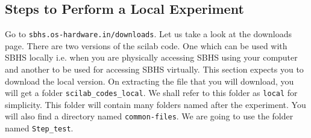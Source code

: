 \subsection{Steps to Perform a Local Experiment}\label{local-steps}
\label{scilab_sbhs}
Go to {\tt sbhs.os-hardware.in/downloads}. Let us take a look at the downloads page. There are two versions of the scilab code. One which can be used with SBHS locally i.e. when you are physically accessing SBHS using your computer and another to be used for accessing SBHS virtually. This section expects you to download the local version. On extracting the file that you will download, you will get a folder {\tt scilab\_codes\_local}. We shall refer to this folder as {\tt local} for simplicity. This folder will contain many folders named after the experiment. You will also find a directory named {\tt common-files}. We are going to use the folder named {\tt Step\_test}.
